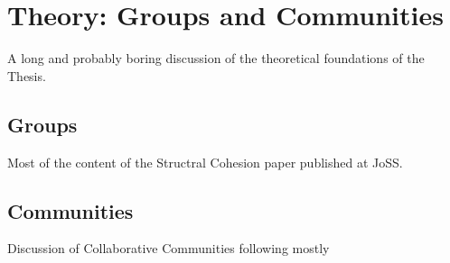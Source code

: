 
\chapter{Theory: Groups and Communities}

A long and probably boring discussion of the theoretical foundations of the Thesis.

\section{Groups}

Most of the content of the Structral Cohesion paper published at JoSS.

\section{Communities}

Discussion of Collaborative Communities following mostly \citet{adler:2006}
